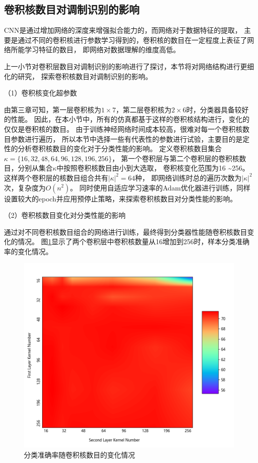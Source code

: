\subsection{卷积核数目对调制识别的影响}
CNN是通过增加网络的深度来增强拟合能力的，而网络对于数据特征的提取，
主要是通过不同的卷积核进行参数学习得到的，卷积核的数目在一定程度上表征了网络所能学习特征的数目，
即网络对数据理解的维度高低。\par
上一小节对卷积层数目对调制识别的影响进行了探讨，本节将对网络结构进行更细化的研究，
探索卷积核数目对调制识别的影响。\par
（1）卷积核变化超参数\par
由第三章可知，第一层卷积核为$1 \times 7$，第二层卷积核为$2 \times 6$时，分类器具备较好的性能。
因此，在本小节中，所有的仿真都基于这样的卷积核结构进行，变化的仅仅是卷积核的数目。
由于训练神经网络时间成本较高，很难对每一个卷积核数目参数进行遍历，
所以本节中选择一些有代表性的参数进行试验，主要目的是定性的分析卷积核数目的变化对于分类性能的影响。
定义卷积核数目集合$\kappa =\{16, 32, 48, 64,  96, 128, 196, 256\}$，
第一个卷积层与第二个卷积层的卷积核数目，分别从集合$\kappa$中按照卷积核数目由小到大选取，
卷积核变化范围为16 \textasciitilde 256。
这样两个卷积层的核数目组合共有$|\kappa|^2=64$种，
即网络训练时总的遍历次数为$|\kappa|^2$次，复杂度为$O(n^2)$。
同时使用自适应学习速率的Adam优化器进行训练，同样设置较大的epoch并应用预停止策略，来探索卷积核数目对分类性能的影响。\par

（2）卷积核数目变化对分类性能的影响\par

通过对不同卷积核数目组合的网络进行训练，最终得到分类器性能随卷积核数目变化的情况。
图\ref{fig_5_3}显示了两个卷积层中卷积核数量从16增加到256时，样本分类准确率的变化情况。\par
\begin{figure}[!h]
	\centering
	\includegraphics[width=0.7\linewidth, height=0.6\linewidth]{figures/chapter_5/fig_5_10}
	\caption{分类准确率随卷积核数目的变化情况}
	\label{fig_5_3}
\end{figure}

